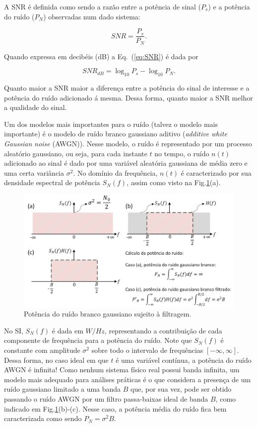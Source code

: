 \documentclass[12pt,addpoints]{exam}
\begin{document}
A SNR é definida como sendo a razão entre a potência de sinal ($P_s$) e a potência do ruído ($P_N$) observadas num dado sistema:

\begin{equation}\label{eq:SNR}
 SNR = \frac{P_s}{P_N}.
\end{equation}

Quando expressa em decibéis (dB) a Eq.~(\ref{eq:SNR}) é dada por

\begin{equation}\label{eq:SNRdB}
 SNR_{dB} = \log_{10}P_s-\log_{10}P_N.
\end{equation}

Quanto maior a SNR maior a diferença entre a potência do sinal de interesse e a potência do ruído adicionado á mesma. Dessa forma, quanto maior a SNR melhor a qualidade do sinal.

Um dos modelos mais importantes para o ruído (talvez o modelo mais importante) é o modelo de ruído branco gaussiano aditivo (\textit{additive white Gaussian noise} (AWGN)). Nesse modelo, o ruído é representado por um processo aleatório gaussiano, ou seja, para cada instante $t$ no tempo, o ruído $n(t)$ adicionado ao sinal é dado por uma variável aleatória gaussiana de média zero e uma certa variância $\sigma^2$. No domínio da frequência, $n(t)$ é caracterizado por sua densidade espectral de potência $S_N(f)$, assim como visto na Fig.\ref{fig:ruidoFiltrado}(a). 

\begin{figure}[h!]
        \centering
        \includegraphics[width=0.8\linewidth]{./Figuras/FiltragemRuidoBranco}
        \caption{Potência do ruído branco gaussiano sujeito à filtragem.} 
        \label{fig:ruidoFiltrado}
\end{figure}

No SI, $S_N(f)$ é dada em $W/Hz$, representando a contribuição de cada componente de frequência para a potência do ruído. Note que $S_N(f)$ é constante com amplitude $\sigma^2$ sobre todo o intervalo de frequências $[-\infty,\infty]$. Dessa forma, no caso ideal em que $t$ é uma variável contínua, a potência do ruído AWGN é infinita! Como nenhum sistema físico real possui banda infinita, um modelo mais adequado para análises práticas é o que considera a presença de um ruído gaussiano limitado a uma banda $B$ que,  por sua vez, pode ser obtido passando o ruído AWGN  por um filtro passa-baixas ideal de banda $B$, como indicado em Fig.\ref{fig:ruidoFiltrado}(b)-(c). Nesse caso, a potência média do ruído fica bem caracterizada como sendo $P_N = \sigma^2B$.
\end{document}
